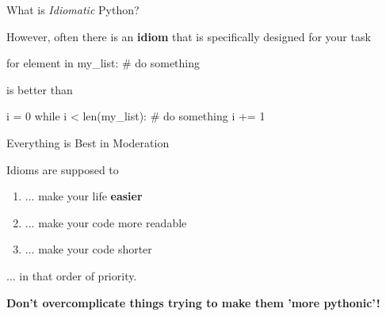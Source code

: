 \begin{frame}[fragile]{What is {\it Idiomatic} Python?}

    However, often there is an {\bf idiom} that is specifically designed for your task

    \vspace{1em}

    \begin{pythoncode}
    for element in my_list:
        # do something
    \end{pythoncode}

    \vspace{0.5em}

    is better than

    \vspace{0.5em}

    \begin{pythoncode}
    i = 0
    while i < len(my_list):
        # do something
        i += 1
    \end{pythoncode}


\end{frame}

\begin{frame}{Everything is Best in Moderation}

    Idioms are supposed to

    \begin{enumerate}
        \item ... make your life {\bf easier}
        \item ... make your code more readable
        \item ... make your code shorter
    \end{enumerate}

    ... in that order of priority.

    \vspace{1em}

    \begin{alertblock}{}
        {\bf Don't overcomplicate things trying to make them 'more pythonic'!}
    \end{alertblock}

\end{frame}

